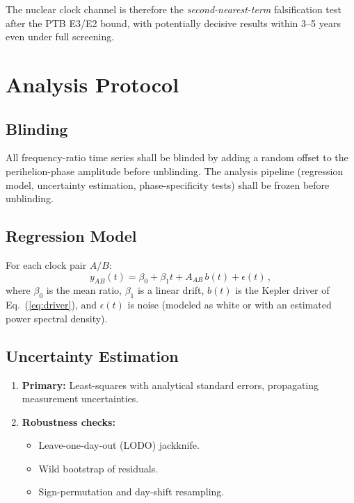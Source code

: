 \documentclass[twocolumn,showpacs,preprintnumbers,amsmath,amssymb,prd]{revtex4-2}
\begin{document}
The nuclear clock channel is therefore the \emph{second-nearest-term}
falsification test after the PTB E3/E2 bound, with potentially
decisive results within 3--5 years even under full screening.

\section{Analysis Protocol}\label{sec:protocol}

\subsection{Blinding}

All frequency-ratio time series shall be blinded by adding a
random offset to the perihelion-phase amplitude before unblinding.
The analysis pipeline (regression model, uncertainty estimation,
phase-specificity tests) shall be frozen before unblinding.

\subsection{Regression Model}

For each clock pair $A/B$:
\begin{equation}\label{eq:regression}
y_{AB}(t) = \beta_0 + \beta_1 t + A_{AB}\,b(t) + \epsilon(t)\,,
\end{equation}
where $\beta_0$ is the mean ratio, $\beta_1$ is a linear drift,
$b(t)$ is the Kepler driver of Eq.~(\ref{eq:driver}), and
$\epsilon(t)$ is noise (modeled as white or with an estimated
power spectral density).

\subsection{Uncertainty Estimation}

\begin{enumerate}
\item \textbf{Primary:} Least-squares with analytical standard
  errors, propagating measurement uncertainties.

\item \textbf{Robustness checks:}
  \begin{itemize}
  \item Leave-one-day-out (LODO) jackknife.
  \item Wild bootstrap of residuals.
  \item Sign-permutation and day-shift resampling.
  \end{itemize}
\end{enumerate}
\end{document}
